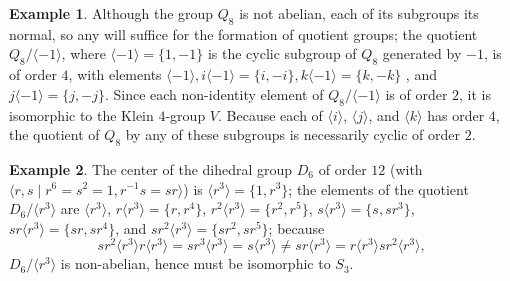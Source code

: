 \documentclass{article}
\theoremstyle{plain}
\theoremstyle{definition}
\newtheorem*{example*}{Example}
\newcommand{\set}[1]{\{#1\}}
\newcommand{\vbrack}[1]{\langle#1\rangle}
\begin{document}
\begin{example*}
Although the group $Q_8$ is not abelian, each of its subgroups its normal, so any will suffice for the formation
of quotient groups; the quotient $Q_8/\vbrack{-1}$, where $\vbrack{-1}=\set{1,-1}$ is the cyclic subgroup of $Q_8$ generated by $-1$, is of order $4$, with elements $\vbrack{-1},i\vbrack{-1}=\set{i,-i},k\vbrack{-1}=\set{k,-k}$ , and $j\vbrack{-1}=\set{j,-j}$. Since each non-identity element of $Q_8/\vbrack{-1}$ is of order $2$, it is isomorphic to the Klein $4$-group $V$. Because each of $\vbrack{i}$, $\vbrack{j}$, and $\vbrack{k}$ has order $4$, the quotient of $Q_8$ by any of these subgroups is necessarily cyclic of order $2$.
\end{example*}

\begin{example*}
The center of the dihedral group $D_6$ of order $12$ (with  $\vbrack{r,s\mid r^6=s^2=1,r^{-1}s=sr}$) is $\vbrack{r^3}=\set{1,r^3}$; the elements of the quotient $D_6/\vbrack{r^3}$ are $\vbrack{r^3}$, $r\vbrack{r^3}=\set{r,r^4}$, $r^2\vbrack{r^3}=\set{r^2,r^5}$, $s\vbrack{r^3}=\set{s,sr^3}$, $sr\vbrack{r^3}=\set{sr,sr^4}$, and $sr^2\vbrack{r^3}=\set{sr^2,sr^5}$; because
\begin{equation*} 
sr^2\vbrack{r^3}r\vbrack{r^3}=sr^3\vbrack{r^3}=s\vbrack{r^3}\neq sr\vbrack{r^3}=r\vbrack{r^3}sr^2\vbrack{r^3}\text{,}
\end{equation*}
$D_6/\vbrack{r^3}$ is non-abelian, hence must be isomorphic to $S_3$.
\end{example*}
\end{document}
